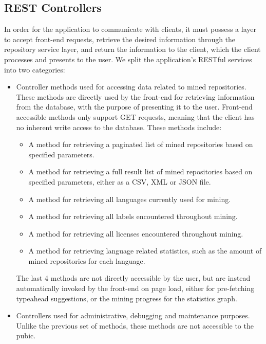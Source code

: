 \newpage
\subsection{REST Controllers}

In order for the application to communicate with clients, it must possess a layer to accept front-end requests, retrieve the desired information through the repository service layer, and return the information to the client, which the client processes and presents to the user. We split the application's RESTful services into two categories:

\begin{itemize}
    \item Controller methods used for accessing data related to mined repositories.
    \\These methods are directly used by the front-end for retrieving information from the database, with the purpose of presenting it to the user.
    Front-end accessible methods only support GET requests, meaning that the client has no inherent write access to the database.
    These methods include:
    \begin{itemize}
        \item A method for retrieving a paginated list of mined repositories based on specified parameters.
        \item A method for retrieving a full result list of mined repositories based on specified parameters, either as a CSV, XML or JSON file.
        \item A method for retrieving all languages currently used for mining.
        \item A method for retrieving all labels encountered throughout mining.
        \item A method for retrieving all licenses encountered throughout mining.
        \item A method for retrieving language related statistics, such as the amount of mined repositories for each language.
    \end{itemize}
    The last 4 methods are not directly accessible by the user, but are instead automatically invoked by the front-end on page load, either for pre-fetching typeahead suggestions, or the mining progress for the statistics graph.
    \item Controllers used for administrative, debugging and maintenance purposes.
    \\Unlike the previous set of methods, these methods are not accessible to the pubic.

\end{itemize}
